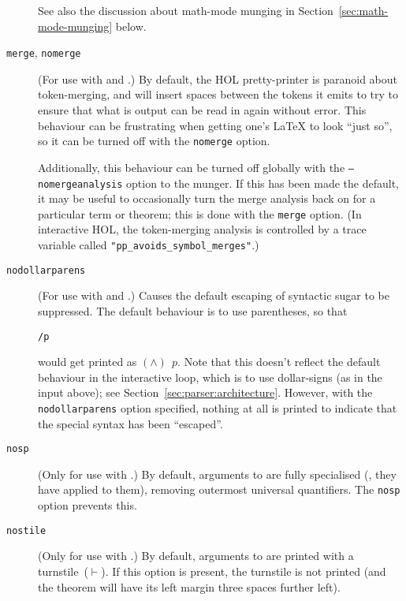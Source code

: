 \begin{description}
See also the discussion about math-mode munging in Section~\ref{sec:math-mode-munging} below.

\item[\texttt{merge}, \texttt{nomerge}] (For use with \holtm{} and \holthm.)
By default, the HOL pretty-printer is paranoid about token-merging, and will insert spaces between the tokens it emits to try to ensure that what is output can be read in again without error.
%
This behaviour can be frustrating when getting one's \LaTeX{} to look ``just so'', so it can be turned off with the \texttt{nomerge} option.

Additionally, this behaviour can be turned off globally with the \texttt{--nomergeanalysis} option to the munger.
%
If this has been made the default, it may be useful to occasionally turn the merge analysis back on for a particular term or theorem; this is done with the \texttt{merge} option.
%
(In interactive HOL, the token-merging analysis is controlled by a trace variable called \texttt{"pp\_avoids\_symbol\_merges"}.)


\item[\texttt{nodollarparens}] (For use with \holtm{} and \holthm.) Causes the default escaping of syntactic sugar to be suppressed.
%
%
The default behaviour is to use parentheses, so that
\begin{alltt}
   \holtm\lb\dol/\bs p\rb
\end{alltt}
would get printed as $(\land)\;\,p$.
Note that this doesn't reflect the default behaviour in the interactive loop, which is to use dollar-signs (as in the input above); see Section~\ref{sec:parser:architecture}.
However, with the \texttt{nodollarparens} option specified, nothing at all is printed to indicate that the special syntax has been ``escaped''.

\item[\texttt{nosp}] (Only for use with \holthm.)
%
By default, arguments to \holthm{} are fully specialised (\ie, they have  applied to them), removing outermost universal quantifiers.
%
The \texttt{nosp} option prevents this.

\item[\texttt{nostile}] (Only for use with \holthm.)
%
By default, arguments to \holthm{} are printed with a turnstile~($\vdash$).
%
If this option is present, the turnstile is not printed (and the theorem will have its left margin three spaces further left).


\end{description}
